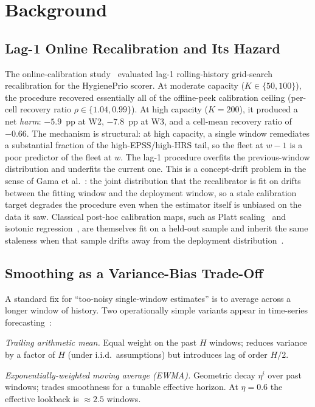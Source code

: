 \section{Background}

\subsection{Lag-1 Online Recalibration and Its Hazard}

The online-calibration study~\cite{paper7online} evaluated lag-1 rolling-history grid-search
recalibration for the HygienePrio scorer. At moderate capacity
($K \in \{50, 100\}$), the procedure recovered essentially all of the
offline-peek calibration ceiling (per-cell recovery ratio $\rho \in
\{1.04, 0.99\}$). At high capacity ($K = 200$), it produced a net
\textit{harm}: $-5.9$~pp at W2, $-7.8$~pp at W3, and a cell-mean
recovery ratio of $-0.66$. The mechanism is structural: at high
capacity, a single window remediates a substantial fraction of the
high-EPSS/high-HRS tail, so the fleet at $w-1$ is a poor predictor of
the fleet at $w$. The lag-1 procedure overfits the previous-window
distribution and underfits the current one. This is a concept-drift
problem in the sense of Gama et al.~\cite{gama2014survey}: the
joint distribution that the recalibrator is fit on drifts between the
fitting window and the deployment window, so a stale calibration
target degrades the procedure even when the estimator itself is
unbiased on the data it saw. Classical post-hoc calibration maps,
such as Platt scaling~\cite{platt1999probabilistic} and isotonic
regression~\cite{zadrozny2002transforming}, are themselves fit on a
held-out sample and inherit the same staleness when that sample drifts
away from the deployment distribution~\cite{niculescu2005predicting}.

\subsection{Smoothing as a Variance-Bias Trade-Off}

A standard fix for ``too-noisy single-window estimates'' is to average
across a longer window of history. Two operationally simple variants
appear in time-series forecasting~\cite{holt2004ewma}:

\textit{Trailing arithmetic mean.} Equal weight on the past $H$
windows; reduces variance by a factor of $H$ (under i.i.d.\
assumptions) but introduces lag of order $H/2$.

\textit{Exponentially-weighted moving average (EWMA).} Geometric
decay $\eta^i$ over past windows; trades smoothness for a tunable
effective horizon. At $\eta = 0.6$ the effective lookback is
$\approx 2.5$ windows.

